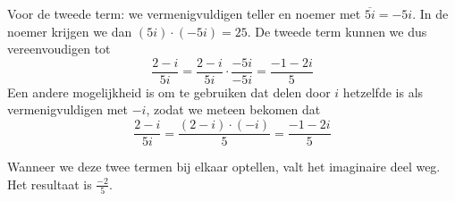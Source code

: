 \documentclass{ximera}
\begin{document}
\begin{exercise}
\begin{question}
\begin{oplossing}
Voor de tweede term: we vermenigvuldigen teller en noemer met $\overline{5i} = -5i$. In de noemer krijgen we dan $(5i)\cdot(-5i) = 25$. De tweede term kunnen we dus vereenvoudigen tot
$$
\frac{2-i}{5i} = \frac{2-i}{5i} \cdot \frac{-5i}{-5i} = \frac{-1-2i}{5}
$$
Een andere mogelijkheid is om te gebruiken dat delen door $i$ hetzelfde is als vermenigvuldigen met $-i$, zodat we meteen bekomen dat
$$
\frac{2-i}{5i} = \frac{(2-i)\cdot (-i)}{5} = \frac{-1-2i}{5}
$$

Wanneer we deze twee termen bij elkaar optellen, valt het imaginaire deel weg. Het resultaat is $\frac{-2}{5}$. 
\end{oplossing}
\end{question}
\end{exercise}


\end{document}

